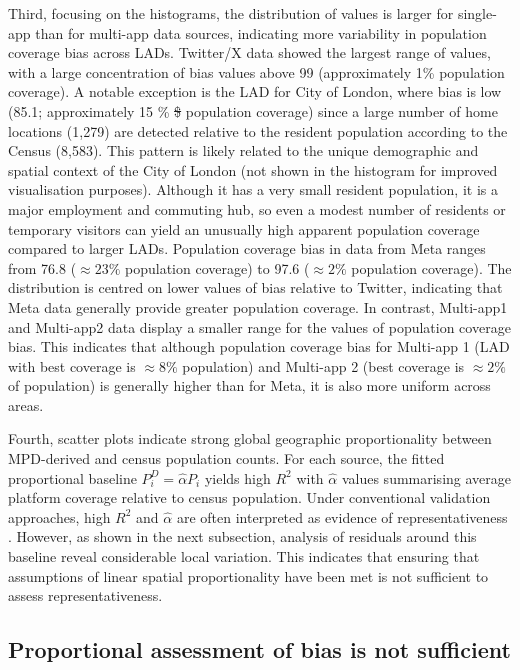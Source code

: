 \documentclass[]{rsos}%
\providecommand{\DIFdel}[1]{{\protect\color{red}\sout{#1}}}                      %
\providecommand{\DIFdelbegin}{} %
\providecommand{\DIFdelend}{} %
\begin{document}
Third, focusing on the histograms, the distribution of values is larger
for single-app than for multi-app data sources, indicating more
variability in population coverage bias across LADs. Twitter/X data
showed the largest range of values, with a large concentration of bias
values above 99 (approximately 1\% population coverage). A notable
exception is the LAD for City of London, where bias is low (85.1;
approximately 15 \% \DIFdelbegin \DIFdel{\$ }\DIFdelend population coverage) since a large number of home
locations (1,279) are detected relative to the resident population
according to the Census (8,583). This pattern is likely related to the
unique demographic and spatial context of the City of London (not shown
in the histogram for improved visualisation purposes). Although it has a
very small resident population, it is a major employment and commuting
hub, so even a modest number of residents or temporary visitors can
yield an unusually high apparent population coverage compared to larger
LADs. Population coverage bias in data from Meta ranges from 76.8
(\(\approx 23 \%\) population coverage) to 97.6 (\(\approx 2 \%\) population
coverage). The distribution is centred on lower values of bias relative
to Twitter, indicating that Meta data generally provide greater
population coverage. In contrast, Multi-app1 and Multi-app2 data display
a smaller range for the values of population coverage bias. This
indicates that although population coverage bias for Multi-app 1 (LAD
with best coverage is \(\approx 8 \%\) population) and Multi-app 2 (best
coverage is \(\approx 2\%\) of population) is generally higher than for
Meta, it is also more uniform across areas.

Fourth, scatter plots indicate strong global geographic proportionality
between MPD-derived and census population counts. For each source, the
fitted proportional baseline \(P_i^D = \hat{\alpha}P_i\) yields high \(R^2\)
with \(\hat{\alpha}\) values summarising average platform coverage
relative to census population. Under conventional validation approaches,
high \(R^2\) and \(\hat{\alpha}\) are often interpreted as evidence of
representativeness \citep{iradukunda2025estimating, renninger2026}. However,
as shown in the next subsection, analysis of residuals around this
baseline reveal considerable local variation. This indicates that
ensuring that assumptions of linear spatial proportionality have been
met is not sufficient to assess representativeness.

\subsection{Proportional assessment of bias is not sufficient}\label{proportional-assessment-of-bias-is-not-sufficient}
\end{document}
